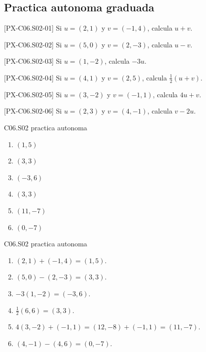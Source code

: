 \subsection*{Practica autonoma graduada}
\begin{exercise}{[PX-C06.S02-01] Si \(u=(2,1)\) y \(v=(-1,4)\), calcula \(u+v\).}
\end{exercise}
\begin{exercise}{[PX-C06.S02-02] Si \(u=(5,0)\) y \(v=(2,-3)\), calcula \(u-v\).}
\end{exercise}
\begin{exercise}{[PX-C06.S02-03] Si \(u=(1,-2)\), calcula \(-3u\).}
\end{exercise}
\begin{exercise}{[PX-C06.S02-04] Si \(u=(4,1)\) y \(v=(2,5)\), calcula \(\frac{1}{2}(u+v)\).}
\end{exercise}
\begin{exercise}{[PX-C06.S02-05] Si \(u=(3,-2)\) y \(v=(-1,1)\), calcula \(4u+v\).}
\end{exercise}
\begin{exercise}{[PX-C06.S02-06] Si \(u=(2,3)\) y \(v=(4,-1)\), calcula \(v-2u\).}
\end{exercise}

\begin{shortanswer}{C06.S02 practica autonoma}
\begin{enumerate}[label=\textbf{PX-C06.S02-\arabic*:}, leftmargin=*]
  \item \((1,5)\)
  \item \((3,3)\)
  \item \((-3,6)\)
  \item \((3,3)\)
  \item \((11,-7)\)
  \item \((0,-7)\)
\end{enumerate}
\end{shortanswer}

\begin{fullsolution}{C06.S02 practica autonoma}
\begin{enumerate}[label=\textbf{PX-C06.S02-\arabic*:}, leftmargin=*]
  \item \((2,1)+(-1,4)=(1,5)\).
  \item \((5,0)-(2,-3)=(3,3)\).
  \item \(-3(1,-2)=(-3,6)\).
  \item \(\frac{1}{2}(6,6)=(3,3)\).
  \item \(4(3,-2)+(-1,1)=(12,-8)+(-1,1)=(11,-7)\).
  \item \((4,-1)-(4,6)=(0,-7)\).
\end{enumerate}
\end{fullsolution}

